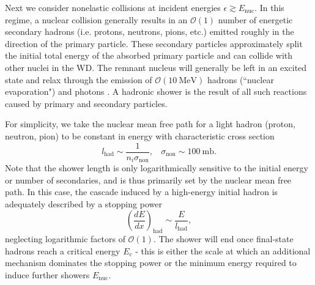\documentclass[twocolumn,showpacs,preprintnumbers,amsmath,amssymb,prd]{revtex4}
\newcommand{\OO}{\mathcal{O}}
\def\r{\right)}
\def\l{\left(}
\begin{document}
\begin{appendices}
Next we consider nonelastic collisions at incident energies $\epsilon \gtrsim E_\text{nuc}$. In this regime, a nuclear collision generally results in an $\OO(1)$ number of energetic secondary hadrons (i.e. protons, neutrons, pions, etc.) emitted roughly in the direction of the primary particle. These secondary particles approximately split the initial total energy of the absorbed primary particle and can collide with other nuclei in the WD. The remnant nucleus will generally be left in an excited state and relax through the emission of $\OO(10 ~\text{MeV})$ hadrons (``nuclear evaporation") and photons \cite{Rossi}. A hadronic shower is the result of all such reactions caused by primary and secondary particles.

For simplicity, we take the nuclear mean free path for a light hadron (proton, neutron, pion) to be constant in energy with characteristic cross section
\begin{equation}
l_\text{had} \sim  \frac{1}{n_i \sigma_\text{non}}, ~~~~ \sigma_\text{non} \sim 100 ~\text{mb}.
\end{equation}
Note that the shower length is only logarithmically sensitive to the initial energy or number of secondaries, and is thus primarily set by the nuclear mean free path. In this case, the cascade induced by a high-energy initial hadron is adequately described by a stopping power
\begin{equation}
\label{eq:nucshower}
\l \frac{dE}{dx}\r_\text{had} \sim \frac{E}{l_\text{had}},
\end{equation}
neglecting logarithmic factors of $\OO(1)$. The shower will end once final-state hadrons reach a critical energy $E_c$ - this is either the scale at which an additional mechanism dominates the stopping power or the minimum energy required to induce further showers $E_\text{nuc}$. 


\end{appendices}
\end{document}
